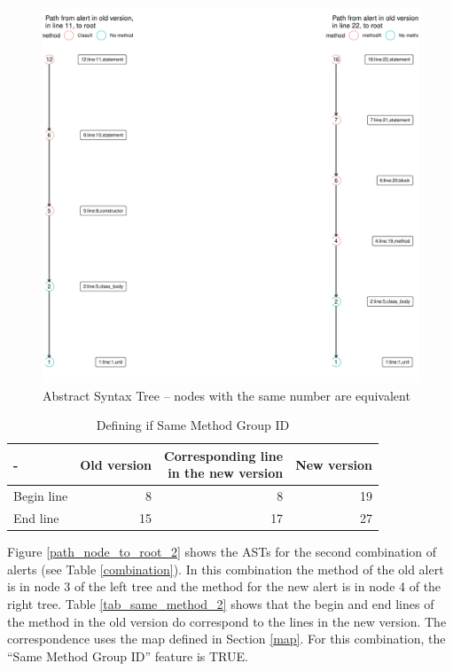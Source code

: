 \documentclass[
]{article}
\begin{document}
\begin{itemize}
%
%

\small
\begin{figure}[H]
\includegraphics[width=0.8\linewidth]{report_files/figure-latex/unnamed-chunk-8-1} \caption{Abstract Syntax Tree -- nodes with the same number are equivalent \label{path_node_to_root_1}}\label{fig:unnamed-chunk-8}
\end{figure}

\begin{table}[H]
\caption{\label{tab:unnamed-chunk-9}Defining if Same Method Group ID \label{tab_same_method}}
\centering
\begin{tabular}[t]{l|r|r|r}
\hline
- & Old version & \makecell[l]{Corresponding line\\in the new version} & New version\\
\hline
Begin line & 8 & 8 & 19\\
\hline
End line & 15 & 17 & 27\\
\hline
\end{tabular}
\end{table}

\normalsize

Figure \ref{path_node_to_root_2} shows the ASTs for the second
combination of alerts (see Table \ref{combination}). In this
combination the method of the old alert is in node 3 of the left tree
and the method for the new alert is in node 4 of the right tree. Table
\ref{tab_same_method_2} shows that the begin and end lines of the method
in the old version do correspond to the lines in the new version. The
correspondence uses the map defined in Section \ref{map}. For this
combination, the ``Same Method Group ID'' feature is TRUE.


\end{itemize}
\end{document}
